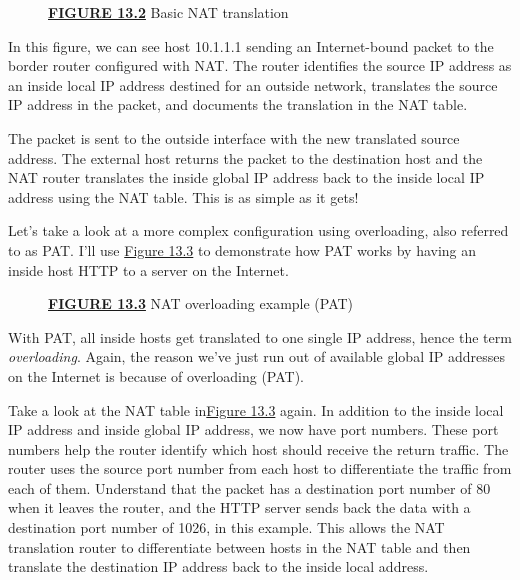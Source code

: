 \documentclass[b5paper,11pt]{memoir}
\begin{document}
\begin{figure}
\centering

\caption{{\protect\hyperlink{c13.xhtmlux5cux23figureanchor13-2}{\textbf{FIGURE
13.2}} Basic NAT translation}}
\end{figure}

In this figure, we
can see host 10.1.1.1 sending an Internet-bound packet to the border
router configured with NAT. The router identifies the source IP address
as an inside local IP address destined for an outside network,
translates the source IP address in the packet, and documents the
translation in the NAT table.

The packet is sent to the outside interface with the new translated
source address. The external host returns the packet to the destination
host and the NAT router translates the inside global IP address back to
the inside local IP address using the NAT table. This is as simple as it
gets!

Let's take a look at a more complex configuration using overloading,
also referred to as PAT. I'll use
\protect\hyperlink{c13.xhtmlux5cux23figure13-3}{Figure 13.3} to
demonstrate how PAT works by having an inside host HTTP to a server on
the Internet.

\begin{figure}
\centering

\caption{{\protect\hyperlink{c13.xhtmlux5cux23figureanchor13-3}{\textbf{FIGURE
13.3}} NAT overloading example (PAT)}}
\end{figure}

With PAT, all inside hosts get translated to one single IP address,
hence the term \emph{overloading}. Again, the reason we've just run out
of available global IP addresses on the Internet is because of
overloading (PAT).

Take a look at the NAT table
in\protect\hyperlink{c13.xhtmlux5cux23figure13-3}{Figure 13.3} again. In
addition to the inside local IP address and inside global IP address, we
now have port numbers. These port numbers help the router identify which
host should receive the return traffic. The router uses the source port
number from each host to differentiate the traffic from each of them.
Understand that the packet has a destination port number of 80 when it
leaves the router, and the HTTP server sends back the data with a
destination port number of 1026, in this example. This allows the NAT
translation router to differentiate between hosts in the NAT table and
then translate the destination IP address back to the inside local
address.
\end{document}
